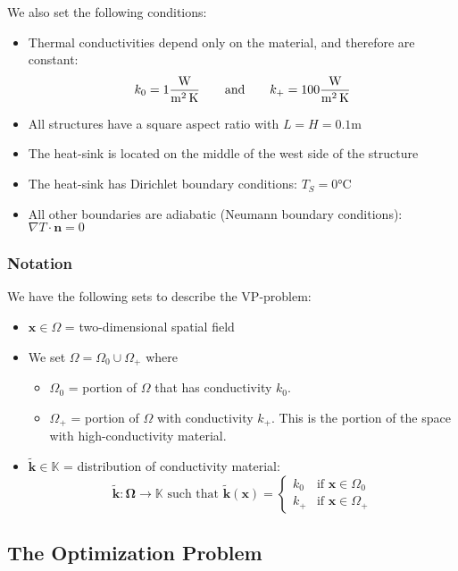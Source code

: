 We also set the following conditions:
\begin{itemize}
	\item Thermal conductivities depend only on the material, and therefore are constant:
	$$k_0=1 \si[per-mode=fraction]{\watt\per\square\meter\per\kelvin}\qquad\text{and}\qquad k_+=100 \si[per-mode=fraction]{\watt\per\square\meter\per\kelvin}$$
	\item All structures have a square aspect ratio with $L=H=0.1\si{\meter}$
	\item The heat-sink is located on the middle of the west side of the structure
	\item The heat-sink has Dirichlet boundary conditions: $T_S=0\si{\celsius}$
	\item All other boundaries are adiabatic (Neumann boundary conditions): $\nabla T\cdot\mathbf{n}=0$
\end{itemize}

\subsubsection*{Notation}

We have the following sets to describe the VP-problem:
\begin{itemize}
	\item $\mathbf{x}\in\Omega$ = two-dimensional spatial field
	\item[] We set $\Omega = \Omega_0\cup\Omega_+$ where
	\begin{itemize}
		\item $\Omega_0$ = portion of $\Omega$ that has conductivity $k_0$.
		\item $\Omega_+$ = portion of $\Omega$ with conductivity $k_+$. This is the portion of the space with high-conductivity material.
	\end{itemize}
	\item $\tilde{\mathbf{k}}\in\mathbb{K}$ = distribution of conductivity material: $$\tilde{\mathbf{k}}:\mathbf{\Omega}\rightarrow\mathbb{K}\text{ such that } \tilde{\mathbf{k}}(\mathbf{x})=\begin{cases}
		k_0 &\text{if }\mathbf{x}\in\Omega_0\\ k_+ &\text{if }\mathbf{x}\in\Omega_+
	\end{cases}$$
\end{itemize}

\subsection{The Optimization Problem}

